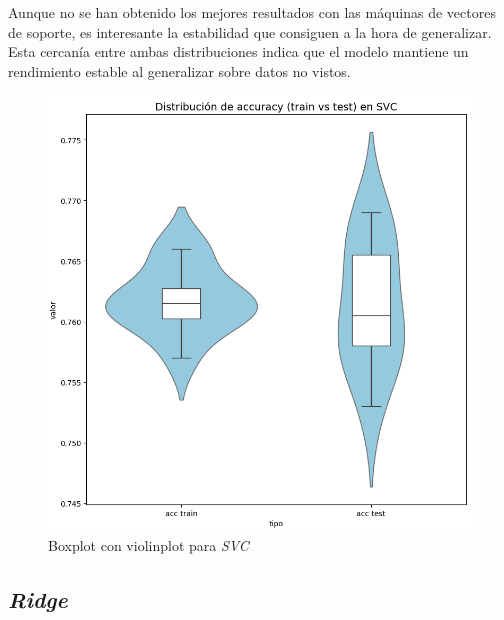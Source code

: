 \vspace{1em}

Aunque no se han obtenido los mejores resultados con las máquinas de vectores de soporte, es interesante la estabilidad que consiguen a la hora de generalizar. Esta cercanía entre ambas distribuciones indica que el modelo mantiene un rendimiento estable al generalizar sobre datos no vistos.

\begin{figure}[H]
	\centering
	\includegraphics[width=1\linewidth]{Imagenes/svm_bin}
	\caption[Boxplot con violinplot para \textit{SVC}]{Boxplot con violinplot para \textit{SVC}}
	\label{fig:svm_bin}
\end{figure}

\subsection{\textit{Ridge}}
\label{subsec:ridge_bin}

